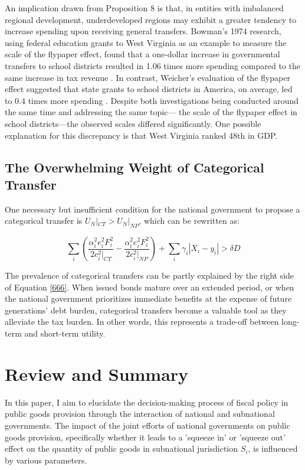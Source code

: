\documentclass[man]{apa7}
\begin{document}
An implication drawn from Proposition 8 is that, in entities with imbalanced regional development, underdeveloped regions may exhibit a greater tendency to increase spending upon receiving general transfers. Bowman's 1974 research, using federal education grants to West Virginia as an example to measure the scale of the flypaper effect, found that a one-dollar increase in governmental transfers to school districts resulted in 1.06 times more spending compared to the same increase in tax revenue \parencite{bowman1974tax}. In contrast, Weicher's evaluation of the flypaper effect suggested that state grants to school districts in America, on average, led to 0.4 times more spending \parencite{weicher1972aid}. Despite both investigations being conducted around the same time and addressing the same topic— the scale of the flypaper effect in school districts—the observed scales differed significantly. One possible explanation for this discrepancy is that West Virginia ranked 48th in GDP.%

\subsection{The Overwhelming Weight of Categorical Transfer}

One necessary but insufficient condition for the national government to propose a categorical transfer is $U_N|_{CT} > U_N|_{NP}$, which can be rewritten as:

\begin{equation}
  \sum_i(\frac{\alpha_i^2e_i^2F_i^2}{2c_i^2|_{CT}}-\frac{\alpha_i^2e_i^2F_i^2}{2c_i^2|_{NP}}) +\sum_i\gamma_i|X_i-y_i|>\delta D \label{666}
\end{equation}

The prevalence of categorical transfers can be partly explained by the right side of Equation \ref{666}. When issued bonds mature over an extended period, or when the national government prioritizes immediate benefits at the expense of future generations' debt burden, categorical transfers become a valuable tool as they alleviate the tax burden. In other words, this represents a trade-off between long-term and short-term utility.

\section{Review and Summary}

In this paper, I aim to elucidate the decision-making process of fiscal policy in public goods provision through the interaction of national and subnational governments. The impact of the joint efforts of national governments on public goods provision, specifically whether it leads to a 'squeeze in' or 'squeeze out' effect on the quantity of public goods in subnational jurisdiction $S_i$, is influenced by various parameters. %
\end{document}
